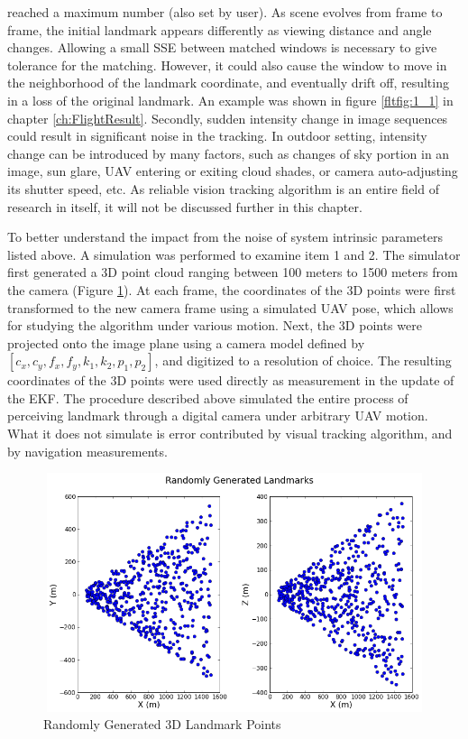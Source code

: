 \begin{enumerate}
  reached a maximum number (also set by user). As scene evolves from
  frame to frame, the initial landmark appears differently as viewing
  distance and angle changes. Allowing a small SSE between matched
  windows is necessary to give tolerance for the matching. However, it
  could also cause the window to move in the neighborhood of the
  landmark coordinate, and eventually drift off, resulting in a loss
  of the original landmark. An example was shown in figure
  \ref{fltfig:1_1} in chapter \ref{ch:FlightResult}. Secondly, sudden
  intensity change in image sequences could result in significant
  noise in the tracking. In outdoor setting, intensity change can be
  introduced by many factors, such as changes of sky portion in an
  image, sun glare, UAV entering or exiting cloud shades, or camera
  auto-adjusting its shutter speed, etc. As reliable vision tracking
  algorithm is an entire field of research in itself, it will not be
  discussed further in this chapter.

\end{enumerate}

To better understand the impact from the noise of system intrinsic
parameters listed above. A simulation was performed to examine item 1
and 2. The simulator first generated a 3D point cloud ranging between
100 meters to 1500 meters from the camera (Figure \ref{fig:simfig51}).
At each frame, the coordinates of the 3D points were first transformed
to the new camera frame using a simulated UAV pose, which allows for
studying the algorithm under various motion. Next, the 3D points were
projected onto the image plane using a camera model defined by
$[c_{x}, c_{y}, f_{x}, f_{y}, k_{1}, k_{2}, p_{1}, p_{2}]$, and
digitized to a resolution of choice. The resulting coordinates of the
3D points were used directly as measurement in the update of the EKF.
The procedure described above simulated the entire process of
perceiving landmark through a digital camera under arbitrary UAV
motion. What it does not simulate is error contributed by visual
tracking algorithm, and by navigation measurements.

\begin{figure}[h]
\centering
\includegraphics[width=12cm, height=7cm]{./Figures/SimulationFigures/Figure51.png}
\caption{Randomly Generated 3D Landmark Points}
\label{fig:simfig51}
\end{figure}
\FloatBarrier

